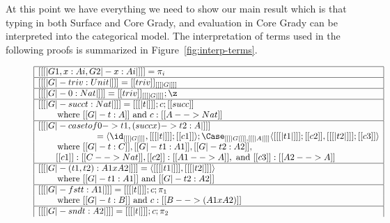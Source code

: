 At this point we have everything we need to show our main result which
is that typing in both Surface and Core Grady, and evaluation in Core
Grady can be interpreted into the categorical model.  The
interpretation of terms used in the following proofs is summarized in
Figure~\ref{fig:interp-terms}.
\begin{figure}
  \small  
    \begin{center}
      \begin{math}
          \begin{array}{|l|}
            \hline
            [[ [| G1 , x : Ai , G2 |- x : Ai |] ]] = \pi_i\\
            \hline
            [[ [| G |- triv : Unit |] ]] = [[triv]]_{[[ [| G |] ]]}\\
            \hline
            [[ [| G |- 0 : Nat |] ]] = [[triv]]_{[[ [| G |] ]]};\z\\
            \hline
            [[ [| G |- succ t : Nat |] ]] = [[ [| t |] ]];c;[[succ]]\\
            \,\,\,\,\,\,\,\,\,\,\,\text{ where } [[G |- t : A]]\text{ and }c : [[A --> Nat]]\\
            \hline
            [[ [| G |- case t of 0 -> t1, (succ x) -> t2 : A |] ]]\\
            \,\,\,\,\,\,\,\,\,\,\,\,\,\,\,\,\,\,\,\,\,\,\,\,\,\,\,\,\,\,\,\,\,\,\,\,\,\,\,\,           
     = \langle \id_{[[ [| G |] ]]}, [[ [| t |] ]];[[c1]] \rangle;\Case_{[[ [| G |] ]], [[ [| A |] ]]}\langle [[ [|t1|] ]];[[c2]], [[ [| t2 |] ]];[[c3]] \rangle\\
     \,\,\,\,\,\,\,\,\,\,\,\text{ where } [[G |- t : C]], [[G |- t1 : A1]], [[G |- t2 : A2]],\\
     \,\,\,\,\,\,\,\,\,\,\,\,[[c1]] : [[C --> Nat]], [[c2]] : [[A1 --> A]], \text{ and } [[c3]] : [[A2 --> A]]\\
            \hline
            [[ [| G |- (t1,t2) : A1 x A2 |] ]] = \langle [[ [| t1 |] ]] , [[ [| t2 |] ]] \rangle\\
            \,\,\,\,\,\,\,\,\,\,\,\text{ where } [[G |- t1 : A1]]\text{ and } [[G |- t2 : A2]]\\
            \hline
            [[ [| G |- fst t : A1 |] ]] = [[ [| t |] ]];c;\pi_1\\
            \,\,\,\,\,\,\,\,\,\,\,\text{ where } [[G |- t : B]]\text{ and }c : [[B --> (A1 x A2)]]\\
            \hline
            [[ [| G |- snd t : A2 |] ]] = [[ [| t |] ]];c;\pi_2\\           

\end{array}
\end{math}
\end{center}
\end{figure}
